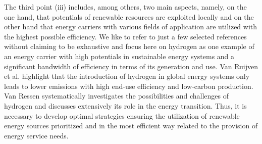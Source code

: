 The third point (iii) includes, among others, two main aspects, namely, on the one hand, that potentials of renewable resources are exploited locally and on the other hand that energy carriers with various fields of application are utilized with the highest possible efficiency. We like to refer to just a few selected references without claiming to be exhaustive and focus here on hydrogen as one example of an energy carrier with high potentials in sustainable energy systems and a significant bandwidth of efficiency in terms of its generation and use. Van Ruijven et al. \cite{van2007potential} highlight that the introduction of hydrogen in global energy systems only leads to lower emissions with high end-use efficiency and low-carbon production. Van Ressen \cite{van2020hydrogen} systematically investigates the possibilities and challenges of hydrogen and discusses extensively its role in the energy transition.  Thus, it is necessary to develop optimal strategies ensuring the utilization of renewable energy sources prioritized and in the most efficient way related to the provision of energy service needs.\newline 

